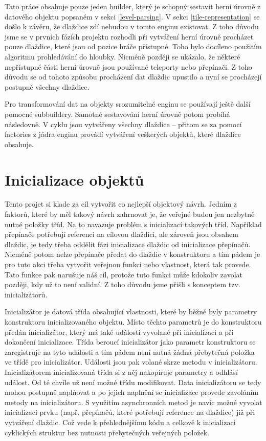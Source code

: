 Tato práce obsahuje pouze jeden builder, který je schopný sestavit herní úrovně z datového objektu popsaném v sekci \ref{level-parsing}.
V sekci \ref{tile-representation} se došlo k závěru, že dlaždice zdí nebudou v tomto enginu existovat. Z toho důvodu jsme se 
v prvních fázích projektu rozhodli při vytváření herní úrovně procházet pouze dlaždice, které jsou od pozice hráče přístupné.
Toho bylo docíleno použitím algoritmu prohledávání do hloubky. Nicméně později se ukázalo, že některé nepřístupné části herní úrovně
jsou používané teleporty nebo přepínači. Z toho důvodu se od tohoto způsobu procházení dat dlaždic upustilo a nyní se procházejí 
postupně všechny dlaždice.

Pro transformování dat na objekty srozumitelné enginu se používají ještě další pomocné subbuildery. 
Samotné sestavování herní úrovně potom probíhá následovně. V cyklu jsou vytvářeny všechny dlaždice -- přitom se za pomocí factories 
z jádra enginu provádí vytváření veškerých objektů, které dlaždice obsahuje.


\section{Inicializace objektů}\label{level-inicialization}

Tento projet si klade za cíl  vytvořit co nejlepší objektový návrh. Jedním z faktorů, které by měl takový návrh
zahrnovat je, že veřejné budou jen nezbytně nutné položky tříd. Na to navazuje problém s inicializací takových tříd. 
Například přepínače potřebují referenci na cílovou dlaždici, ale zároveň jsou obsahem dlaždic, je tedy třeba oddělit fázi inicializace 
dlaždic od inicializace přepínačů. Nicméně potom nelze přepínače předat do dlaždic v konstruktoru a tím pádem je pro tuto akci třeba 
vytvořit veřejnou funkci nebo vlastnost, která tak provede. Tato funkce pak narušuje náš cíl, protože tuto funkci může kdokoliv
zavolat později, kdy už to není validní. Z toho důvodu jsme přišli s konceptem tzv. inicializátorů.

Inicializátor je datová třída obsahující vlastnosti, které by běžně byly parametry konstruktoru inicializovaného objektu.
Místo těchto parametrů je do konstruktoru předán inicializátor, který má také události vyvolané
při inicializaci a při dokončení inicializace. Třída beroucí inicializátor jako parametr konstruktoru se zaregistruje na tyto události a
tím pádem není nutná žádná přebytečná položka ve třídě pro inicializátor. Události jsou pak volané skrze metodu v inicializátoru.
Inicializátorem inicializovaná třída si z něj nakopíruje parametry a odhlásí událost. Od té chvíle už není možné třídu modifikovat.
Data inicializátoru se tedy mohou postupně naplňovat a po jejich naplnění se inicializace provede zavoláním metody na inicializátoru.
S využitím asynchronních metod je navíc možné vyvolat inicializaci prvku  (např. přepínačů, které potřebují reference na dlaždice) 
již při vytváření dlaždic. Což vede k přehlednějšímu kódu a celkově k inicializaci cyklických struktur bez nutnosti přebytečných 
veřejných položek. 

